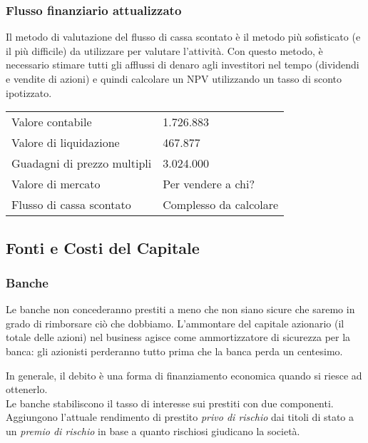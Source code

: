 \documentclass[a4paper,portrait,12pt]{article}
\theoremstyle{definition}
\begin{document}
\subsubsection{Flusso finanziario attualizzato}

Il metodo di valutazione del flusso di cassa scontato è il metodo più sofisticato (e il più difficile) da utilizzare per valutare l'attività.
Con questo metodo, è necessario stimare tutti gli afflussi di denaro agli investitori nel tempo (dividendi e vendite di azioni) e quindi calcolare un NPV utilizzando un tasso di sconto ipotizzato.


\begin{table}[H]
\begin{center}
\begin{tabular}{ll}
Valore contabile & 1.726.883\\
Valore di liquidazione & 467.877\\
Guadagni di prezzo multipli & 3.024.000\\
Valore di mercato & Per vendere a chi?\\
Flusso di cassa scontato & Complesso da calcolare
\end{tabular}
\end{center}
\end{table}


\subsection{Fonti e Costi del Capitale}


\subsubsection{Banche}

Le banche non concederanno prestiti a meno che non siano sicure che saremo in grado di rimborsare ciò che dobbiamo.
L'ammontare del capitale azionario (il totale delle azioni) nel business agisce come ammortizzatore di sicurezza per la banca: gli azionisti perderanno tutto prima che la banca perda un centesimo.

In generale, il debito è una forma di finanziamento economica quando si riesce ad ottenerlo.\\

Le banche stabiliscono il tasso di interesse sui prestiti con due componenti.
Aggiungono l'attuale rendimento di prestito \emph{privo di rischio} dai titoli di stato a un \emph{premio di rischio} in base a quanto rischiosi giudicano la società.
\end{document}
